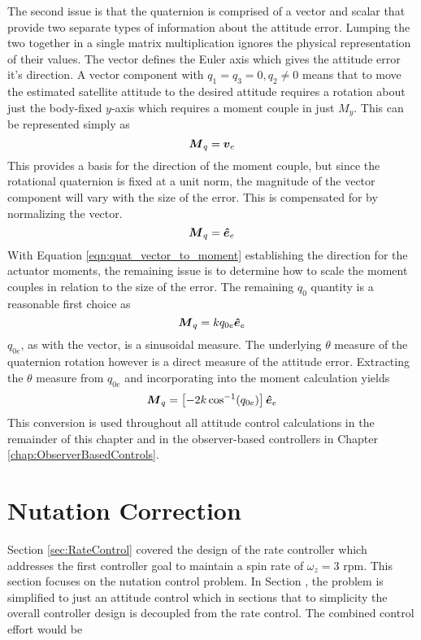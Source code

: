 The second issue is that the quaternion is comprised of a vector and scalar that provide two separate types of information about the attitude error.  Lumping the two together in a single matrix multiplication ignores the physical representation of their values.  The vector defines the Euler axis which gives the attitude error it's direction.  A vector component with $q_1 = q_3 = 0, q_2 \ne 0$ means that to move the estimated satellite attitude to the desired attitude requires a rotation about just the body-fixed $y$-axis which requires a moment couple in just $M_y$.  This can be represented simply as
\begin{equation}
  \boldsymbol{M}_{q} = \boldsymbol{v}_e
\end{equation}
This provides a basis for the direction of the moment couple, but since the rotational quaternion is fixed at a unit norm, the magnitude of the vector component will vary with the size of the error.  This is compensated for by normalizing the vector.
\begin{equation}
  \boldsymbol{M}_{q} = \boldsymbol{\hat{e}}_e
  \label{eqn:quat_vector_to_moment}
\end{equation}
With Equation \ref{eqn:quat_vector_to_moment} establishing the direction for the actuator moments, the remaining issue is to determine how to scale the moment couples in relation to the size of the error.  The remaining $q_0$ quantity is a reasonable first choice as
\begin{equation}
  \boldsymbol{M}_{q} = kq_{0e} \boldsymbol{\hat{e}}_e
\end{equation}
$q_{0e}$, as with the vector, is a sinusoidal measure.  The underlying $\theta$ measure of the quaternion rotation however is a direct measure of the attitude error.  Extracting the $\theta$ measure from $q_{0e}$ and incorporating into the moment calculation yields
\begin{equation}
  \boldsymbol{M}_{q} = \left[-2 k \cos^{-1} (q_{0e}) \right] \boldsymbol{\hat{e}}_e
  \label{eqn:QuaternionToMomentConversion}
\end{equation}
This conversion is used throughout all attitude control calculations in the remainder of this chapter and in the observer-based controllers in Chapter \ref{chap:ObserverBasedControls}.

\section{Nutation Correction}
\label{sec:NutationCorrection}

Section \ref{sec:RateControl} covered the design of the rate controller which addresses the first controller goal to maintain a spin rate of $\omega_z = 3$ rpm.  This section focuses on the nutation control problem.  In Section , the problem is simplified to just an attitude control  which in sections that to simplicity the overall controller design is decoupled from the rate control.  The combined control effort would be

